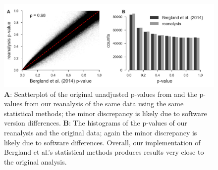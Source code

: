 \documentclass[11pt]{article}
\begin{document}
\begin{figure}[!ht]
  \centering
  \includegraphics[width=\textwidth]{figures/bergland_pvalues.pdf}

  \caption{\textbf{A}: Scatterplot of the original unadjusted p-values from
    \textcite{Bergland2014-ij} and the p-values from our reanalysis of the same
    data using the same statistical methods; the minor discrepancy is likely
    due to software version differences. \textbf{B}: The histograms of the
    p-values of our reanalysis and the original \textcite{Bergland2014-ij}
    data; again the minor discrepancy is likely due to software differences.
    Overall, our implementation of Bergland et al.'s statistical methods
    produces results very close to the original analysis.}

  \label{suppfig:bergland-pvalue-comparison}
\end{figure}
\end{document}
